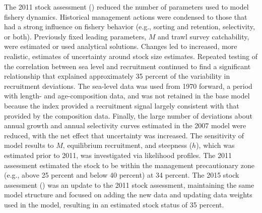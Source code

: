 \documentclass[
  english,
]{article}
\begin{document}
The 2011 stock assessment () reduced the number of parameters used to model fishery
dynamics. Historical management actions were condensed to those that had
a strong influence on fishery behavior (e.g., sorting and retention,
selectivity, or both). Previously fixed leading parameters, \(M\) and
trawl survey catchability, were estimated or used analytical solutions.
Changes led to increased, more realistic, estimates of uncertainty
around stock size estimates. Repeated testing of the correlation between
sea level and recruitment continued to find a significant relationship
that explained approximately 35 percent of the variability in
recruitment deviations. The sea-level data was used from 1970 forward, a
period with length- and age-composition data, and was not retained in
the base model because the index provided a recruitment signal largely
consistent with that provided by the composition data. Finally, the
large number of deviations about annual growth and annual selectivity
curves estimated in the 2007 model were reduced, with the net effect
that uncertainty was increased. The sensitivity of model results to
\(M\), equilibrium recruitment, and steepness (\(h\)), which was
estimated prior to 2011, was investigated via likelihood profiles. The
2011 assessment estimated the stock to be within the management
precautionary zone (e.g., above 25 percent and below 40 percent) at 34
percent. The 2015 stock assessment
() was an update
to the 2011 stock assessment, maintaining the same model structure and
focused on adding the new data and updating data weights used in the
model, resulting in an estimated stock status of 35 percent.
\end{document}
